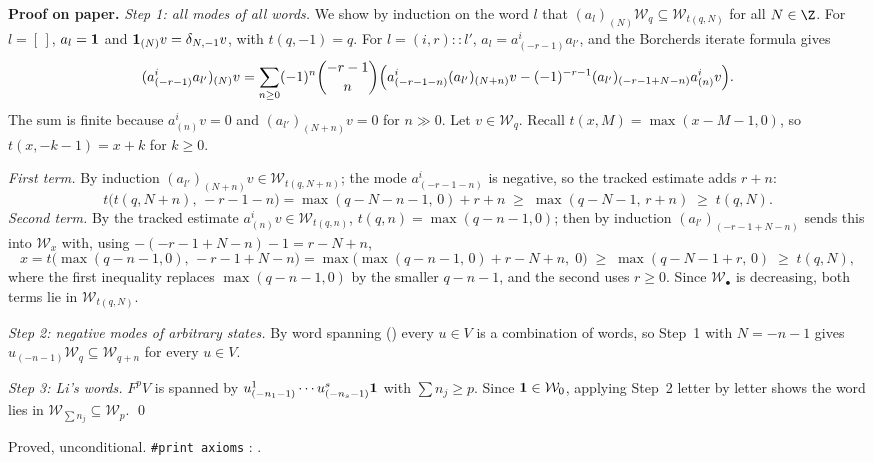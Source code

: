 \textbf{Proof on paper.} \emph{Step 1: all modes of all words.} We show by induction on the word $l$ that
$(a_l)_{(N)}\mathcal W_q\subseteq \mathcal W_{t(q,N)}$ for all $N\in\Z$. For $l=[\,]$, $a_l = \mathbf{1}$ and $\mathbf{1}_{(N)}v = \delta_{N,-1}v$,
with $t(q,-1) = q$. For $l = (i,r)::l'$, $a_l = a^i_{(-r-1)}a_{l'}$, and the Borcherds iterate formula gives
\begin{equation*}
  (a^i_{(-r-1)}a_{l'})_{(N)}v = \sum_{n\ge0}(-1)^n\binom{-r-1}{n}
  \Bigl(a^i_{(-r-1-n)}(a_{l'})_{(N+n)}v - (-1)^{-r-1}(a_{l'})_{(-r-1+N-n)}a^i_{(n)}v\Bigr).
\end{equation*}
The sum is finite because $a^i_{(n)}v = 0$ and $(a_{l'})_{(N+n)}v=0$ for $n\gg0$. Let $v\in\mathcal W_q$. Recall
$t(x,M) = \max(x-M-1,0)$, so $t(x,-k-1) = x+k$ for $k\ge0$.

\emph{First term.} By induction $(a_{l'})_{(N+n)}v\in\mathcal W_{t(q,N+n)}$; the mode $a^i_{(-r-1-n)}$ is negative, so the
tracked estimate adds $r+n$:
\begin{equation*}
  t\bigl(t(q,N+n),\,-r-1-n\bigr) = \max(q-N-n-1,\,0)+r+n \;\ge\; \max(q-N-1,\,r+n) \;\ge\; t(q,N).
\end{equation*}
\emph{Second term.} By the tracked estimate $a^i_{(n)}v\in\mathcal W_{t(q,n)}$, $t(q,n) = \max(q-n-1,0)$; then by induction
$(a_{l'})_{(-r-1+N-n)}$ sends this into $\mathcal W_{x}$ with, using $-(-r-1+N-n)-1 = r-N+n$,
\begin{equation*}
  x = t\bigl(\max(q-n-1,0),\,-r-1+N-n\bigr) = \max\bigl(\max(q-n-1,\,0)+r-N+n,\;0\bigr)
  \;\ge\; \max(q-N-1+r,\,0) \;\ge\; t(q,N),
\end{equation*}
where the first inequality replaces $\max(q-n-1,0)$ by the smaller $q-n-1$, and the second uses $r\ge0$. Since
$\mathcal W_\bullet$ is decreasing, both terms lie in $\mathcal W_{t(q,N)}$.

\emph{Step 2: negative modes of arbitrary states.} By word spanning () every $u\in V$ is a combination of words, so
Step~1 with $N=-n-1$ gives $u_{(-n-1)}\mathcal W_q\subseteq \mathcal W_{q+n}$ for every $u\in V$.

\emph{Step 3: Li's words.} $F^pV$ is spanned by $u^1_{(-n_1-1)}\cdots u^s_{(-n_s-1)}\mathbf{1}$ with $\sum n_j\ge p$. Since
$\mathbf{1}\in \mathcal W_0$, applying Step~2 letter by letter shows the word lies in $\mathcal W_{\sum n_j}\subseteq \mathcal W_p$. \qed

\begin{status}
Proved, unconditional. \texttt{\#print axioms}
\allowbreak{}\allowbreak{}\allowbreak{}: \lean{[propext, Classical.}\allowbreak{}\allowbreak\lean{sound]}.
\end{status}

